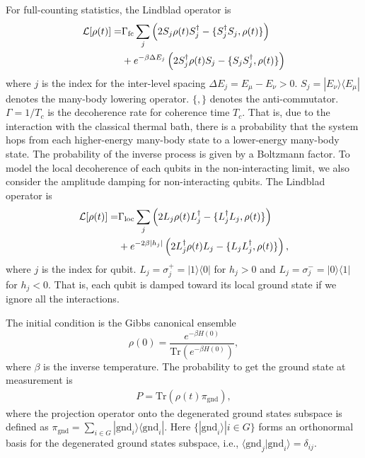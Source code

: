 \documentclass[prd,twocolumn,tightenlines,preprintnumbers,showpacs,superscriptaddress,notitlepage,nofootinbib,eqsecnum,floatfix,longbibliography,aps,10pt]{revtex4-2}
\begin{document}
For full-counting statistics, the Lindblad operator is
\begin{align}
\mathcal{L}[\rho (t)] = & \Gamma_{\textrm{fc}} \sum_j   \left(2 S_j \rho(t) S_j^\dagger - \{ S^\dagger_j S_j, \rho(t) \}\right) \notag \\
& + e^{-\beta \Delta E_j} \left(2 S_j^\dagger \rho(t) S_j - \{ S_j S^\dagger_j, \rho(t) \} \right)
\end{align}
where $j$ is the index for the inter-level spacing $\Delta E_j=E_\mu-E_\nu>0$. $S_j=|E_\nu \rangle \langle E_\mu|$ denotes the many-body lowering operator.
$\{, \}$ denotes the anti-commutator. $\Gamma = 1/T_c$ is the decoherence rate for coherence time $T_c$.
That is, due to the interaction with the classical thermal bath, there is a probability that the system hops from each higher-energy many-body state to a lower-energy many-body state.
The probability of the inverse process is given by a Boltzmann factor.
To model the local decoherence of each qubits in the non-interacting limit, we also consider the amplitude damping for non-interacting qubits.
The Lindblad operator is
\begin{align}
\mathcal{L}[\rho (t)] = &  \Gamma_{\textrm{loc}} \sum_j \left(2L_j \rho(t) L_j^\dagger - \{ L^\dagger_j L_j, \rho(t) \} \right)\notag \\
& + e^{- 2 \beta |h_j| }  \left(2L_j^\dagger \rho(t) L_j - \{ L_j L_j^\dagger, \rho(t) \} \right) ,
\end{align}
where $j$ is the index for qubit.
$L_j= \sigma^{+}_j=|1\rangle \langle 0|$ for $h_j>0$ and $L_j= \sigma^{-}_j=|0\rangle \langle 1|$ for $h_j<0$.
That is, each qubit is damped toward its local ground state if we ignore all the interactions.

The initial condition is the Gibbs canonical ensemble
\begin{equation}
\rho (0) =  \frac{e^{-\beta H(0)}}{\mbox{Tr}\left(e^{-\beta H(0)}\right)} ,
\end{equation}
where $\beta$ is the inverse temperature.
The probability to get the ground state at measurement is
\begin{align}
P =  \mbox{Tr} \left( \rho (t) \pi_{\mbox{gnd}} \right)  ,
\end{align}
where the projection operator onto the degenerated ground states subspace is defined as $\pi_{\mbox{gnd}}=\sum_{i\in G} |\mbox{gnd}_i\rangle \langle \mbox{gnd}_i| $.
Here $\{ | \mbox{gnd}_i \rangle | i \in G \}$ forms an orthonormal basis for the degenerated ground states subspace, i.e., $\langle \mbox{gnd}_j | \mbox{gnd}_i \rangle = \delta_{ij}$.
\end{document}
